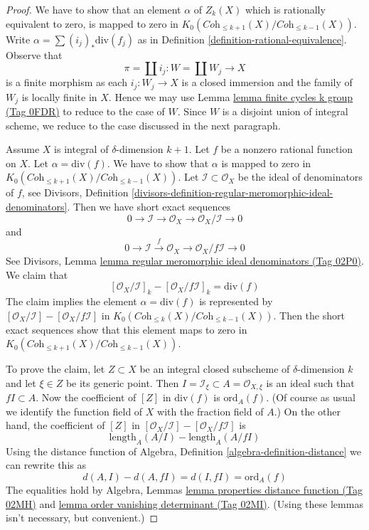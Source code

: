 \documentclass{amsart}
\theoremstyle{plain}
\theoremstyle{definition}
\theoremstyle{remark}
\numberwithin{equation}{subsection}
\begin{document}
\begin{proof}
We have to show that an element $\alpha$ of $Z_k(X)$ which is rationally
equivalent to zero, is mapped to zero in
$K_0(\textit{Coh}_{\leq k + 1}(X)/\textit{Coh}_{\leq k - 1}(X))$.
Write $\alpha = \sum (i_j)_*\text{div}(f_j)$ as in
Definition \ref{definition-rational-equivalence}.
Observe that
$$
\pi = \coprod i_j : W = \coprod W_j \longrightarrow X
$$
is a finite morphism as each $i_j : W_j \to X$ is a closed immersion
and the family of $W_j$ is locally finite in $X$. Hence we may use
Lemma \href{https://stacks.math.columbia.edu/tag/0FDR}{lemma finite cycles k group (Tag 0FDR)} to reduce to the case of $W$.
Since $W$ is a disjoint union of integral scheme, we reduce
to the case discussed in the next paragraph.

\medskip\noindent
Assume $X$ is integral of $\delta$-dimension $k + 1$.
Let $f$ be a nonzero rational function on $X$.
Let $\alpha = \text{div}(f)$. We have to show that
$\alpha$ is mapped to zero in
$K_0(\textit{Coh}_{\leq k + 1}(X)/\textit{Coh}_{\leq k - 1}(X))$.
Let $\mathcal{I} \subset \mathcal{O}_X$ be the ideal of denominators
of $f$, see Divisors, Definition
\ref{divisors-definition-regular-meromorphic-ideal-denominators}.
Then we have short exact sequences
$$
0 \to \mathcal{I} \to \mathcal{O}_X \to \mathcal{O}_X/\mathcal{I} \to 0
$$
and
$$
0 \to \mathcal{I} \xrightarrow{f} \mathcal{O}_X \to
\mathcal{O}_X/f\mathcal{I} \to 0
$$
See Divisors, Lemma
\href{https://stacks.math.columbia.edu/tag/02P0}{lemma regular meromorphic ideal denominators (Tag 02P0)}.
We claim that
$$
[\mathcal{O}_X/\mathcal{I}]_k - [\mathcal{O}_X/f\mathcal{I}]_k =
\text{div}(f)
$$
The claim implies the element $\alpha = \text{div}(f)$ is represented by
$[\mathcal{O}_X/\mathcal{I}] - [\mathcal{O}_X/f\mathcal{I}]$
in $K_0(\textit{Coh}_{\leq k}(X)/\textit{Coh}_{\leq k - 1}(X))$.
Then the short exact sequences show that this element maps to
zero in $K_0(\textit{Coh}_{\leq k + 1}(X)/\textit{Coh}_{\leq k - 1}(X))$.

\medskip\noindent
To prove the claim, let $Z \subset X$ be an integral closed subscheme
of $\delta$-dimension $k$ and let $\xi \in Z$ be its generic point.
Then $I = \mathcal{I}_\xi \subset A = \mathcal{O}_{X, \xi}$
is an ideal such that $fI \subset A$. Now the coefficient of
$[Z]$ in $\text{div}(f)$ is $\text{ord}_A(f)$. (Of course as usual
we identify the function field of $X$ with the fraction field of $A$.)
On the other hand, the coefficient of $[Z]$ in
$[\mathcal{O}_X/\mathcal{I}] - [\mathcal{O}_X/f\mathcal{I}]$
is
$$
\text{length}_A(A/I) - \text{length}_A(A/fI)
$$
Using the distance function of
Algebra, Definition \ref{algebra-definition-distance}
we can rewrite this as
$$
d(A, I) - d(A, fI) = d(I, fI) = \text{ord}_A(f)
$$
The equalities hold by Algebra, Lemmas
\href{https://stacks.math.columbia.edu/tag/02MH}{lemma properties distance function (Tag 02MH)} and
\href{https://stacks.math.columbia.edu/tag/02MI}{lemma order vanishing determinant (Tag 02MI)}.
(Using these lemmas isn't necessary, but convenient.)
\end{proof}
\end{document}
